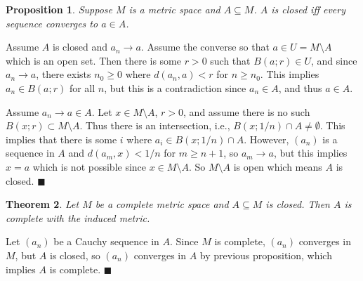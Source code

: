 \documentclass[letter-paper]{tufte-book}
\newtheorem{theorem}{\color{pastel-blue}Theorem}[section]
\newtheorem{proposition}[theorem]{\color{pastel-blue}Proposition}
\newenvironment{proof}[1][Proof]{\begin{trivlist}
\item[\hskip \labelsep {\bfseries #1}]}{\end{trivlist}}
\newcommand{\qed}{\hfill$\blacksquare$}
\begin{document}
\begin{proposition}
  Suppose $M$ is a metric space and $A \subseteq M$. $A$ is closed iff every
  sequence converges to $a \in A$.
\end{proposition}

\begin{proof}
  Assume $A$ is closed and $a_n \to a$. Assume the converse so that $a \in U = M
  \setminus A$ which is an open set. Then there is some $r > 0$ such that $B(a;
  r) \in U$, and since $a_n \to a$, there exists $n_0 \geq 0$ where $d(a_n, a) <
  r$ for $n \geq n_0$. This implies $a_n \in B(a; r)$ for all $n$, but this is a
  contradiction since $a_n \in A$, and thus $a \in A$.
  
  Assume $a_n \to a \in A$. Let $x \in M\setminus A$, $r > 0$, and assume there
  is no such $B(x; r) \subset M\setminus A$. Thus there is an intersection,
  i.e., $B(x; 1/n) \cap A \neq \emptyset$. This implies that there is some $i$
  where $a_i \in B(x; 1/n) \cap A$. However, $(a_n)$ is a sequence in $A$ and
  $d(a_m, x) < 1/n$ for $m \geq n+1$, so $a_m \to a$, but this implies $x = a$
  which is not possible since $x \in M\setminus A$. So $M\setminus A$ is open
  which means $A$ is closed. \qed
\end{proof}

\begin{theorem}
  Let $M$ be a complete metric space and $A\subseteq M$ is closed. Then $A$ is
  complete with the induced metric.
\end{theorem}

\begin{proof}
  Let $(a_n)$ be a Cauchy sequence in $A$. Since $M$ is complete, $(a_n)$
  converges in $M$, but $A$ is closed, so $(a_n)$ converges in $A$ by previous
  proposition, which implies $A$ is complete. \qed
\end{proof}
\end{document}
